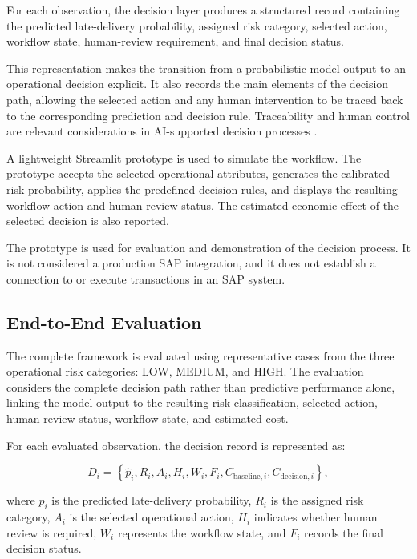 \documentclass[10pt,a4paper]{article}
\begin{document}
For each observation, the decision layer produces a structured record
containing the predicted late-delivery probability, assigned risk
category, selected action, workflow state, human-review requirement,
and final decision status.

This representation makes the transition from a probabilistic model
output to an operational decision explicit. It also records the main
elements of the decision path, allowing the selected action and any
human intervention to be traced back to the corresponding prediction
and decision rule. Traceability and human control are relevant
considerations in AI-supported decision processes
\cite{amershi2019guidelines,shneiderman2020human}.

A lightweight Streamlit prototype is used to simulate the workflow.
The prototype accepts the selected operational attributes, generates
the calibrated risk probability, applies the predefined decision
rules, and displays the resulting workflow action and human-review
status. The estimated economic effect of the selected decision is also
reported.

The prototype is used for evaluation and demonstration of the
decision process. It is not considered a production SAP integration,
and it does not establish a connection to or execute transactions in
an SAP system.

\subsection{End-to-End Evaluation}

The complete framework is evaluated using representative cases from
the three operational risk categories: LOW, MEDIUM, and HIGH. The
evaluation considers the complete decision path rather than predictive
performance alone, linking the model output to the resulting risk
classification, selected action, human-review status, workflow state,
and estimated cost.

For each evaluated observation, the decision record is represented as:

\begin{equation}
D_i =
\left\{
\hat{p}_i,
R_i,
A_i,
H_i,
W_i,
F_i,
C_{\mathrm{baseline},i},
C_{\mathrm{decision},i}
\right\},
\label{eq:decision_record}
\end{equation}

where $\hat{p}_i$ is the predicted late-delivery probability, $R_i$
is the assigned risk category, $A_i$ is the selected operational
action, $H_i$ indicates whether human review is required, $W_i$
represents the workflow state, and $F_i$ records the final decision
status.
\end{document}
